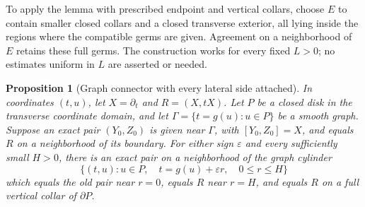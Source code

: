 \documentclass[11pt]{article}
\newtheorem{proposition}[theorem]{Proposition}
\theoremstyle{remark}
\begin{document}
To apply the lemma with prescribed endpoint and vertical collars, choose $E$ to contain smaller closed collars and a closed transverse exterior, all lying inside the regions where the compatible germs are given. Agreement on a neighborhood of $E$ retains these full germs. The construction works for every fixed $L>0$; no estimates uniform in $L$ are asserted or needed.

\begin{proposition}[Graph connector with every lateral side attached]
\label{prop:graph}
In coordinates $(t,u)$, let $X=\partial_t$ and $R=(X,tX)$. Let $P$ be a closed disk in the transverse coordinate domain, and let $\Gamma=\{t=g(u):u\in P\}$ be a smooth graph. Suppose an exact pair $(Y_0,Z_0)$ is given near $\Gamma$, with $[Y_0,Z_0]=X$, and equals $R$ on a neighborhood of its boundary. For either sign $\varepsilon$ and every sufficiently small $H>0$, there is an exact pair on a neighborhood of the graph cylinder
$$
 \{(t,u):u\in P,\quad t=g(u)+\varepsilon r,\quad0\le r\le H\}
$$
which equals the old pair near $r=0$, equals $R$ near $r=H$, and equals $R$ on a full vertical collar of $\partial P$.
\end{proposition}
\end{document}
